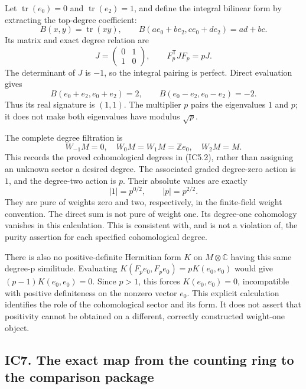 \documentclass[
]{article}
\begin{document}
Let \(\operatorname{tr}(e_0)=0\) and \(\operatorname{tr}(e_2)=1\), and
define the integral bilinear form by extracting the top-degree
coefficient: \[
B(x,y)=\operatorname{tr}(xy),\qquad
B(ae_0+be_2,ce_0+de_2)=ad+bc.
\tag{IC6.1}
\] Its matrix and exact degree relation are \[
J=\begin{pmatrix}0&1\\1&0\end{pmatrix},\qquad
F_p^{\mathsf T}JF_p=pJ.
\tag{IC6.2}
\] The determinant of \(J\) is \(-1\), so the integral pairing is
perfect. Direct evaluation gives \[
B(e_0+e_2,e_0+e_2)=2,\qquad
B(e_0-e_2,e_0-e_2)=-2.
\tag{IC6.3}
\] Thus its real signature is \((1,1)\). The multiplier \(p\) pairs the
eigenvalues \(1\) and \(p\); it does not make both eigenvalues have
modulus \(\sqrt p\).

The complete degree filtration is \[
W_{-1}M=0,\quad W_0M=W_1M=\mathbb Ze_0,
\quad W_2M=M.
\tag{IC6.4}
\] This records the proved cohomological degrees in (IC5.2), rather than
assigning an unknown sector a desired degree. The associated graded
degree-zero action is \(1\), and the degree-two action is \(p\). Their
absolute values are exactly \[
|1|=p^{0/2},\qquad |p|=p^{2/2}.
\tag{IC6.5}
\] They are pure of weights zero and two, respectively, in the
finite-field weight convention. The direct sum is not pure of weight
one. Its degree-one cohomology vanishes in this calculation. This is
consistent with, and is not a violation of, the purity assertion for
each specified cohomological degree.

There is also no positive-definite Hermitian form \(K\) on
\(M\otimes\mathbb C\) having this same degree-p similitude. Evaluating
\(K(F_pe_0,F_pe_0)=pK(e_0,e_0)\) would give \((p-1)K(e_0,e_0)=0\). Since
\(p>1\), this forces \(K(e_0,e_0)=0\), incompatible with positive
definiteness on the nonzero vector \(e_0\). This explicit calculation
identifies the role of the cohomological sector and its form. It does
not assert that positivity cannot be obtained on a different, correctly
constructed weight-one object.

\subsection{IC7. The exact map from the counting ring to the comparison
package}\label{ic7.-the-exact-map-from-the-counting-ring-to-the-comparison-package}
\end{document}
